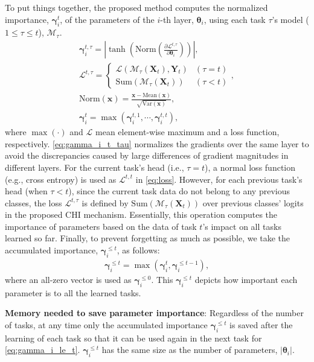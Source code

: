To put things together, the proposed method computes the normalized importance, $\bm{\gamma}_i^t$, of the parameters of the $i$-th layer, $\bm{\theta}_i$, using each task $\tau$'s model ($1\!\le\!\tau\!\le\!t$), $\mathcal{M}_\tau$. 
\begin{gather}
\bm{\gamma}_i^{t, \tau} = \left| \tanh{\left( \mathrm{Norm} \left( \frac{\partial \mathcal{L}^{t, \tau}}{\partial \bm{\theta}_i} \right) \right)} \right|, \label{eq:gamma_i_t_tau} \\
\mathcal{L}^{t, \tau} = 
\begin{cases}
\mathcal{L}\left( \mathcal{M}_\tau\left(\bm{X}_t\right), \bm{Y}_t \right) & (\tau = t) \\
\mathrm{Sum}\left( \mathcal{M}_\tau\left(\bm{X}_t\right) \right) & (\tau < t)
\end{cases}, \label{eq:loss} \\
\mathrm{Norm}(\bm{x}) =  \frac{\bm{x} - \mathrm{Mean}(\bm{x})}{\sqrt{\mathrm{Var}(\bm{x})}}, \label{eq:norm} \\
\bm{\gamma}_i^t = \max{\left( \bm{\gamma}_i^{t,1}, \cdots, \bm{\gamma}_i^{t,t} \right)}, \label{eq:gamma_i_t}
\end{gather}
where $\max{(\cdot)}$ and $\mathcal{L}$ mean element-wise maximum and a loss function, respectively. 
\cref{eq:gamma_i_t_tau} normalizes the gradients over the same layer to avoid the discrepancies caused by large differences of gradient magnitudes in different layers.
For the current task's head (i.e., $\tau\!=\!t$), a normal loss function (e.g., cross entropy) is used as $\mathcal{L}^{t,t}$ in \cref{eq:loss}. 
However, for each previous task’s head (when $\tau\!<\!t$), since the current task data do not belong to any previous classes, 
the loss $\mathcal{L}^{t,\tau}$ is defined by $\mathrm{Sum}(\mathcal{M}_\tau(\bm{X}_t))$ over previous classes' logits in the proposed CHI mechanism. 
Essentially, this operation computes the importance of parameters based on the data of task $t$'s impact on all tasks learned so far.
Finally, to prevent forgetting as much as possible, we take the accumulated importance, $\bm{\gamma}_i^{\le t}$, as follows:
\begin{gather}
\bm{\gamma}_i^{\le t} = \max{\left( \bm{\gamma}_i^t, \bm{\gamma}_i^{\le t-1} \right)}, \label{eq:gamma_i_le_t}
\end{gather}
where an all-zero vector is used as $\bm{\gamma}_i^{\le 0}$. This $\bm{\gamma}_i^{\le t}$ depicts how important each parameter is to all the learned tasks.


\textbf{Memory needed to save parameter importance}: 
Regardless of the number of tasks, at any time only the accumulated importance $\bm{\gamma}_i^{\le t}$ is saved after the learning of each task so that it can be used again in the next task for \cref{eq:gamma_i_le_t}. $\bm{\gamma}_i^{\le t}$ has the same size as the number of parameters, $|\bm{\theta}_i|$.





